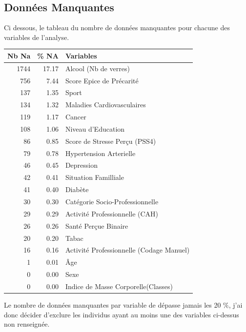 \documentclass{book}
\begin{document}
 
\subsection{Données Manquantes}

\begin{center}
\noindent
Ci dessous, le tableau du nombre de données manquantes pour chacune des variables de l'analyse.\\
\bigskip

\begin{tabular}{rrl}
\toprule
Nb Na & \% NA & Variables\\
\midrule

1744 & 17.17 & Alcool (Nb de verres)\\
756 & 7.44 & Score Epice de Précarité\\
137 & 1.35 & Sport\\

134 & 1.32 & Maladies Cardiovasculaires\\
119 & 1.17 & Cancer\\
108 & 1.06 & Niveau d'Education\\
86 & 0.85 & Score de Stresse Perçu (PSS4)\\
79 & 0.78 & Hypertension Arterielle\\

46 & 0.45 & Depression\\
42 & 0.41 & Situation Familliale\\
41 & 0.40 & Diabète\\
30 & 0.30 & Catégorie Socio-Professionnelle\\

29 & 0.29 & Activité Professionnelle (CAH)\\
26 & 0.26 & Santé Perçue Binaire\\
20 & 0.20 & Tabac\\
16 & 0.16 & Activité Professionnelle (Codage Manuel)\\
1 & 0.01 & Âge\\

0 & 0.00 & Sexe\\
0 & 0.00 & Indice de Masse Corporelle(Classes)\\
\bottomrule
\end{tabular}
\end{center}

\noindent
Le nombre de données manquantes par variable de dépasse jamais les 20 $\%$, j'ai donc décider d'exclure les individus ayant au moins une des variables ci-dessus non renseignée.\\
\end{document}
